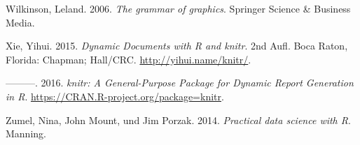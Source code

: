 \documentclass[12pt,ngerman,]{book}
\begin{document}
\hypertarget{ref-wilkinson2006grammar}{}
Wilkinson, Leland. 2006. \emph{The grammar of graphics}. Springer
Science \& Business Media.

\hypertarget{ref-xie2015}{}
Xie, Yihui. 2015. \emph{Dynamic Documents with R and knitr}. 2nd Aufl.
Boca Raton, Florida: Chapman; Hall/CRC. \url{http://yihui.name/knitr/}.

\hypertarget{ref-R-knitr}{}
---------. 2016. \emph{knitr: A General-Purpose Package for Dynamic
Report Generation in R}. \url{https://CRAN.R-project.org/package=knitr}.

\hypertarget{ref-zumel2014practical}{}
Zumel, Nina, John Mount, und Jim Porzak. 2014. \emph{Practical data
science with R}. Manning.

\printindex

\backmatter
\end{document}
